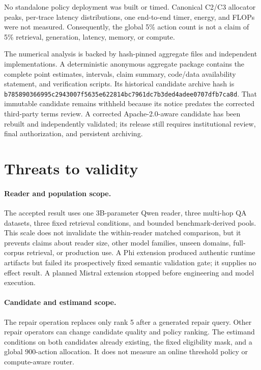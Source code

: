 \documentclass[11pt]{article}
\begin{document}
No standalone policy deployment was built or timed. Canonical C2/C3 allocator peaks, per-trace latency distributions, one end-to-end timer, energy, and FLOPs were not measured. Consequently, the global 5\% action count is not a claim of 5\% retrieval, generation, latency, memory, or compute.

The numerical analysis is backed by hash-pinned aggregate files and independent implementations. A deterministic anonymous aggregate package contains the complete point estimates, intervals, claim summary, code/data availability statement, and verification scripts. Its historical candidate archive hash is \nolinkurl{b785890366995c2943007f5635e622814bc7961dc7b3ded4adee0707dfb7ca8d}. That immutable candidate remains withheld because its notice predates the corrected third-party terms review. A corrected Apache-2.0-aware candidate has been rebuilt and independently validated; its release still requires institutional review, final authorization, and persistent archiving.

\section{Threats to validity}
\paragraph{Reader and population scope.}
The accepted result uses one 3B-parameter Qwen reader, three multi-hop QA datasets, three fixed retrieval conditions, and bounded benchmark-derived pools. This scale does not invalidate the within-reader matched comparison, but it prevents claims about reader size, other model families, unseen domains, full-corpus retrieval, or production use. A Phi extension produced authentic runtime artifacts but failed its prospectively fixed semantic validation gate; it supplies no effect result. A planned Mistral extension stopped before engineering and model execution.

\paragraph{Candidate and estimand scope.}
The repair operation replaces only rank 5 after a generated repair query. Other repair operators can change candidate quality and policy ranking. The estimand conditions on both candidates already existing, the fixed eligibility mask, and a global 900-action allocation. It does not measure an online threshold policy or compute-aware router.
\end{document}
